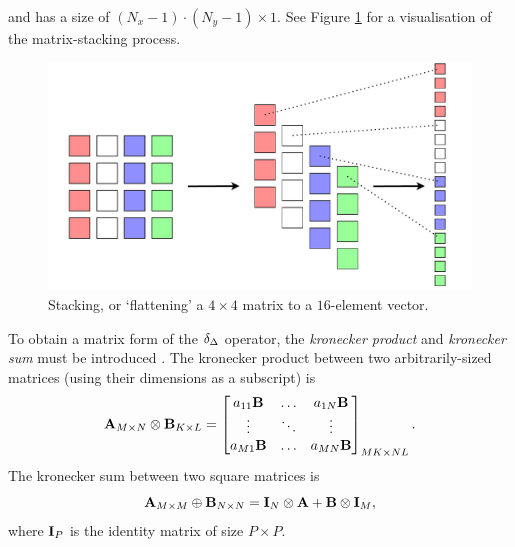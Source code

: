 and has a size of $(N_x-1)\cdot (N_y-1) \times 1$. See Figure \ref{fig:stackingMatrix} for a visualisation of the matrix-stacking process.
\begin{figure}[t]
    \centering
    \includegraphics[width=\textwidth]{figures/resonators/2d/stackingMatrix.pdf}
    \caption{Stacking, or `flattening' a $4\times 4$ matrix to a $16$-element vector. \label{fig:stackingMatrix}}
\end{figure}

To obtain a matrix form of the $\delta_{\Delta}$ operator, the \textit{kronecker product} and \textit{kronecker sum} must be introduced \cite{Horn1991}. The kronecker product between two arbitrarily-sized matrices (using their dimensions as a subscript) is
\begin{equation}
    \mathbf{A}_{M\times N} \otimes \mathbf{B}_{K\times L} = \begin{bmatrix}
        a_{11}\mathbf{B} & \hdots & a_{1N}\mathbf{B}\\
        \vdots & \ddots & \vdots\\
        a_{M1}\mathbf{B} & \hdots & a_{MN}\mathbf{B}\\
    \end{bmatrix}_{MK \times NL}.
\end{equation}
The kronecker sum between two square matrices is 
\begin{equation}
    \mathbf{A}_{M \times M} \oplus \mathbf{B}_{N \times N} = \mathbf{I}_N\otimes \mathbf{A} + \mathbf{B} \otimes\mathbf{I}_M,
\end{equation}
where $\mathbf{I}_P$ is the identity matrix of size $P\times P$. 

